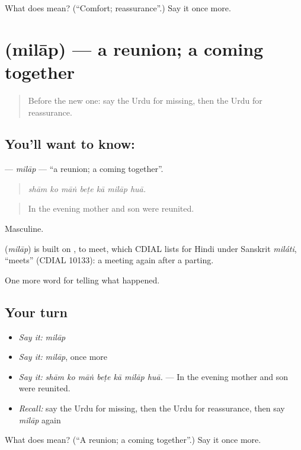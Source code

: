 \begin{tcolorbox}[breakable,colback=teal!4,colframe=teal!35!black,title={Before you move on}]
What does  mean? (\textquotedblleft{}Comfort; reassurance\textquotedblright{}.) Say it once more.
\end{tcolorbox}
\section[\texorpdfstring{\ur{ملاپ} (milāp)}{ملاپ (milāp)}]{ (milāp) — a reunion; a coming together}

\label{lesson:UR-C298-milap}



\begin{quote}
Before the new one: say the Urdu for missing, then the Urdu for reassurance.
\end{quote}

\subsection*{You'll want to know: }
\textbf{} — \emph{milāp} — \textquotedblleft{}a reunion; a coming together\textquotedblright{}.

\begin{quote}
      
\end{quote}

\begin{quote}
\emph{shām ko māṅ beṭe kā milāp huā.}
\end{quote}

\begin{quote}
In the evening mother and son were reunited.
\end{quote}

Masculine.

\begin{cousinweb}
\textbf{} (\emph{milāp}) is built on \textbf{}, to meet, which CDIAL lists for Hindi under Sanskrit \emph{miláti}, \textquotedblleft{}meets\textquotedblright{} (CDIAL 10133): a meeting again after a parting.
\end{cousinweb}

\begin{grammarlens}[title={What you've built}]
One more word for telling what happened.
\end{grammarlens}

\subsection*{Your turn}
\begin{itemize}
\raggedright
  \item \emph{Say it:} \emph{milāp}
  \item \emph{Say it:} \emph{milāp}, once more
  \item \emph{Say it:} \emph{shām ko māṅ beṭe kā milāp huā.} — In the evening mother and son were reunited.
  \item \emph{Recall:} say the Urdu for missing, then the Urdu for reassurance, then say \emph{milāp} again
\end{itemize}

\begin{tcolorbox}[breakable,colback=teal!4,colframe=teal!35!black,title={Before you move on}]
What does  mean? (\textquotedblleft{}A reunion; a coming together\textquotedblright{}.) Say it once more.
\end{tcolorbox}
